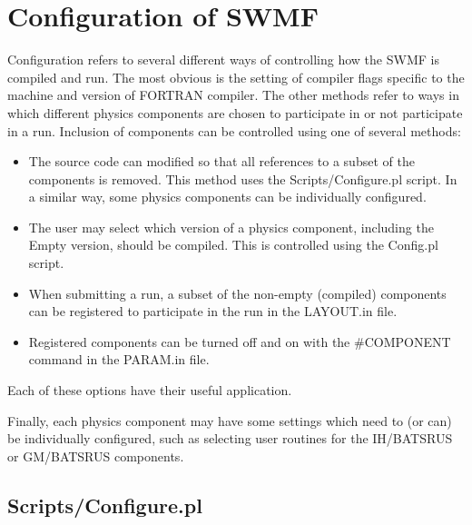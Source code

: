\section{Configuration of SWMF}

Configuration refers to several different ways of controlling how the 
SWMF is compiled and run.  The most obvious is the setting of
compiler flags specific to the machine and version of FORTRAN
compiler.  The other methods refer to ways in which different physics
components are chosen to participate in or not participate in a run.
Inclusion of components can be controlled using one of several methods:

\begin{itemize}
\item The source code can modified so that all references %
      to a subset of the components is removed. %
      This method uses the Scripts/Configure.pl script. %
      In a similar way, some physics components can be individually
      configured.
\item The user may select which version of a physics component,
      including the Empty version,
      should be compiled.  This is controlled using the Config.pl script.
\item When submitting a run, a subset of the non-empty (compiled) 
      components can be
      registered to participate in the run in the LAYOUT.in file.
\item Registered components can be turned off and on with the \#COMPONENT
      command in the PARAM.in file.
\end{itemize}
Each of these options have their useful application.

Finally, each physics component may have some settings which need to
(or can) be individually
configured, such as selecting user routines for the IH/BATSRUS or
GM/BATSRUS components.

\subsection{Scripts/Configure.pl}

